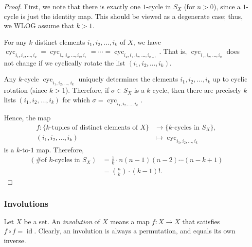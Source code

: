 \begin{proof}
\leanok
First, we note that there is exactly one $1$-cycle in $S_X$ (for $n > 0$),
since a $1$-cycle is just the identity map. This should be viewed as a
degenerate case; thus, we WLOG assume that $k > 1$.

For any $k$ distinct elements $i_1, i_2, \ldots, i_k$ of $X$, we have
$\operatorname{cyc}_{i_1, i_2, \ldots, i_k} =
\operatorname{cyc}_{i_2, i_3, \ldots, i_k, i_1} = \cdots =
\operatorname{cyc}_{i_k, i_1, i_2, \ldots, i_{k-1}}$.
That is, $\operatorname{cyc}_{i_1, i_2, \ldots, i_k}$ does not change if we
cyclically rotate the list $(i_1, i_2, \ldots, i_k)$.

Any $k$-cycle $\operatorname{cyc}_{i_1, i_2, \ldots, i_k}$ uniquely determines
the elements $i_1, i_2, \ldots, i_k$ up to cyclic rotation (since $k > 1$).
Therefore, if $\sigma \in S_X$ is a $k$-cycle, then there are precisely $k$
lists $(i_1, i_2, \ldots, i_k)$ for which
$\sigma = \operatorname{cyc}_{i_1, i_2, \ldots, i_k}$.

Hence, the map
\begin{align*}
f : \{k\text{-tuples of distinct elements of } X\} &\to \{k\text{-cycles in } S_X\}, \\
(i_1, i_2, \ldots, i_k) &\mapsto \operatorname{cyc}_{i_1, i_2, \ldots, i_k}
\end{align*}
is a $k$-to-$1$ map. Therefore,
\begin{align*}
(\text{\# of } k\text{-cycles in } S_X)
&= \frac{1}{k} \cdot n(n-1)(n-2) \cdots (n-k+1) \\
&= \binom{n}{k} \cdot (k-1)!.
\end{align*}
\end{proof}

\subsubsection{Involutions}

\begin{definition}
\label{def.perm.invol}
\leantarget
\leanok
Let $X$ be a set. An \emph{involution} of $X$ means a map $f : X \to X$ that
satisfies $f \circ f = \operatorname{id}$. Clearly, an involution is always a
permutation, and equals its own inverse.
\end{definition}

